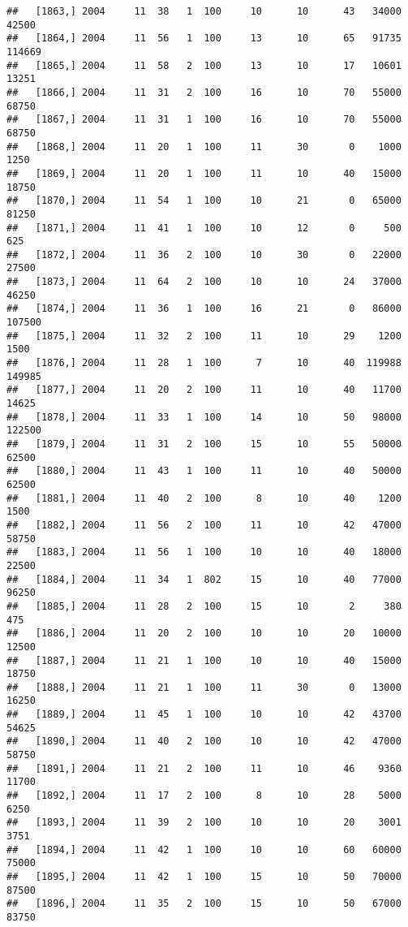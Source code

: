 \documentclass{article}\usepackage[]{graphicx}\usepackage[]{color}
\makeatletter
\newenvironment{kframe}{%
 \def\at@end@of@kframe{}%
 \ifinner\ifhmode%
  \def\at@end@of@kframe{\end{minipage}}%
  \begin{minipage}{\columnwidth}%
 \fi\fi%
 \def\FrameCommand##1{\hskip\@totalleftmargin \hskip-\fboxsep
 \colorbox{shadecolor}{##1}\hskip-\fboxsep
     \hskip-\linewidth \hskip-\@totalleftmargin \hskip\columnwidth}%
 \MakeFramed {\advance\hsize-\width
   \@totalleftmargin\z@ \linewidth\hsize
   \@setminipage}}%
 {\par\unskip\endMakeFramed%
 \at@end@of@kframe}
\newenvironment{knitrout}{}{} %
\makeatother
\begin{document}
\begin{knitrout}
\begin{kframe}
\begin{verbatim}
##   [1863,] 2004     11  38   1  100     10      10      43   34000   42500
##   [1864,] 2004     11  56   1  100     13      10      65   91735  114669
##   [1865,] 2004     11  58   2  100     13      10      17   10601   13251
##   [1866,] 2004     11  31   2  100     16      10      70   55000   68750
##   [1867,] 2004     11  31   1  100     16      10      70   55000   68750
##   [1868,] 2004     11  20   1  100     11      30       0    1000    1250
##   [1869,] 2004     11  20   1  100     11      10      40   15000   18750
##   [1870,] 2004     11  54   1  100     10      21       0   65000   81250
##   [1871,] 2004     11  41   1  100     10      12       0     500     625
##   [1872,] 2004     11  36   2  100     10      30       0   22000   27500
##   [1873,] 2004     11  64   2  100     10      10      24   37000   46250
##   [1874,] 2004     11  36   1  100     16      21       0   86000  107500
##   [1875,] 2004     11  32   2  100     11      10      29    1200    1500
##   [1876,] 2004     11  28   1  100      7      10      40  119988  149985
##   [1877,] 2004     11  20   2  100     11      10      40   11700   14625
##   [1878,] 2004     11  33   1  100     14      10      50   98000  122500
##   [1879,] 2004     11  31   2  100     15      10      55   50000   62500
##   [1880,] 2004     11  43   1  100     11      10      40   50000   62500
##   [1881,] 2004     11  40   2  100      8      10      40    1200    1500
##   [1882,] 2004     11  56   2  100     11      10      42   47000   58750
##   [1883,] 2004     11  56   1  100     10      10      40   18000   22500
##   [1884,] 2004     11  34   1  802     15      10      40   77000   96250
##   [1885,] 2004     11  28   2  100     15      10       2     380     475
##   [1886,] 2004     11  20   2  100     10      10      20   10000   12500
##   [1887,] 2004     11  21   1  100     10      10      40   15000   18750
##   [1888,] 2004     11  21   1  100     11      30       0   13000   16250
##   [1889,] 2004     11  45   1  100     10      10      42   43700   54625
##   [1890,] 2004     11  40   2  100     10      10      42   47000   58750
##   [1891,] 2004     11  21   2  100     11      10      46    9360   11700
##   [1892,] 2004     11  17   2  100      8      10      28    5000    6250
##   [1893,] 2004     11  39   2  100     10      10      20    3001    3751
##   [1894,] 2004     11  42   1  100     10      10      60   60000   75000
##   [1895,] 2004     11  42   1  100     15      10      50   70000   87500
##   [1896,] 2004     11  35   2  100     15      10      50   67000   83750

\end{verbatim}
\end{kframe}
\end{knitrout}
\end{document}
